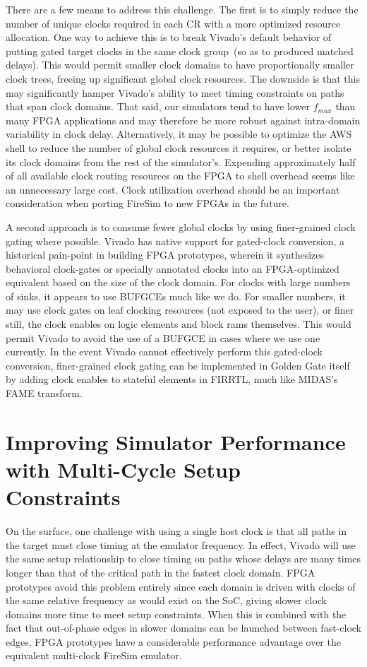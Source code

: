 There are a few means to address this challenge. The first is to simply reduce the number of unique clocks required in each
CR with a more optimized resource allocation. One
way to achieve this is to break Vivado's default behavior of putting gated
target clocks in the same clock group~(so as to produced matched delays). This
would permit smaller clock domains to have proportionally smaller clock trees,
freeing up significant global clock resources. The downside is that this may significantly hamper
Vivado's ability to meet timing constraints on paths that span clock domains.
That said, our simulators tend to have lower $f_{max}$ than many FPGA applications
and may therefore be more robust against intra-domain variability in clock delay. Alternatively, it
may be possible to optimize the AWS shell to reduce the number of global clock
resources it requires, or better isolate its clock domains from the rest of the
simulator's. Expending approximately half of all available clock routing resources on the FPGA
to shell overhead seems like an unnecessary large cost. Clock utilization overhead should be an important consideration
when porting FireSim to new FPGAs in the future.

A second approach is to consume fewer global clocks by using finer-grained
clock gating where possible.  Vivado has native support for gated-clock
conversion, a historical pain-point in building FPGA prototypes, wherein it
synthesizes behavioral clock-gates or specially annotated clocks into an
FPGA-optimized equivalent based on the size of the clock domain. For clocks with large numbers of sinks, it appears
to use BUFGCEs much like we do. For smaller numbers, it may use clock gates on
leaf clocking resources (not exposed to the user), or finer still, the clock
enables on logic elements and block rams themselves. This would permit Vivado
to avoid the use of a BUFGCE in cases where we use one currently.
In the event Vivado cannot effectively perform this gated-clock conversion,
finer-grained clock gating can be implemented in Golden Gate itself by adding
clock enables to stateful elements in FIRRTL, much like MIDAS's FAME transform.

\section{Improving Simulator Performance with Multi-Cycle Setup Constraints}\label{sec:multi-cycle-constraints}

On the surface, one challenge with using a single host clock is that all
paths in the target must close timing at the emulator frequency.
In effect, Vivado will use the same setup relationship to close timing on paths
whose delays are many times longer than that of the critical path in the fastest
clock domain. FPGA prototypes avoid this problem entirely since each
domain is driven with clocks of the same relative frequency as would exist on the SoC, giving slower clock domains
more time to meet setup constraints. When this is combined with the fact that out-of-phase
edges in slower domains can be launched between fast-clock edges, FPGA
prototypes have a considerable performance advantage over the equivalent
multi-clock FireSim emulator.

